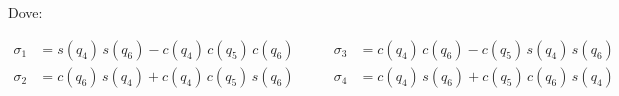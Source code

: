 \documentclass[11pt, a4paper]{article}
\begin{document}
\begin{lrbox}{\rotpagebox}
\begin{minipage}[t][\textwidth][t]{\textheight}
\begin{matlabsymbolicoutput}
\vspace{0.5em}
\noindent Dove:
\vspace{-0.5em}

\[
\begin{aligned}
\sigma_1 &= s\left(q_4 \right)\,s\left(q_6 \right)-c\left(q_4 \right)\,c\left(q_5 \right)\,c\left(q_6 \right) &\qquad \sigma_3 &= c\left(q_4 \right)\,c\left(q_6 \right)-c\left(q_5 \right)\,s\left(q_4 \right)\,s\left(q_6 \right) \\[3pt]
\sigma_2 &= c\left(q_6 \right)\,s\left(q_4 \right)+c\left(q_4 \right)\,c\left(q_5 \right)\,s\left(q_6 \right) &\qquad \sigma_4 &= c\left(q_4 \right)\,s\left(q_6 \right)+c\left(q_5 \right)\,c\left(q_6 \right)\,s\left(q_4 \right)
\end{aligned}
\]
\end{matlabsymbolicoutput}
\end{minipage}

\end{lrbox}
\noindent{}
\end{document}
